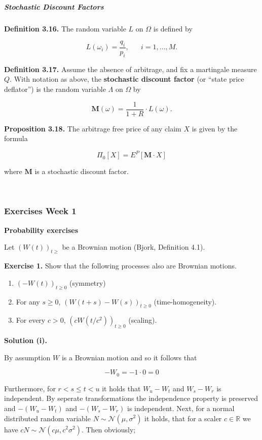 \documentclass[
]{article}
\providecommand{\tightlist}{%
  \setlength{\itemsep}{0pt}\setlength{\parskip}{0pt}}
\begin{document}
\hypertarget{stochastic-discount-factors}{%
\subparagraph{Stochastic Discount
Factors}\label{stochastic-discount-factors}}

\textbf{Definition 3.16.} The random variable \(L\) on \(\Omega\) is
defined by

\[
L(\omega_i)=\frac{q_i}{p_i},\hspace{20pt} i=1,...,M.
\]

\textbf{Definition 3.17.} Assume the absence of arbitrage, and fix a
martingale measure \(Q\). With notation as above, the \textbf{stochastic
discount factor} (or ``state price deflator'') is the random variable
\(\Lambda\) on \(\Omega\) by

\[
\mathbf{M}(\omega)=\frac{1}{1+R}\cdot L(\omega).\tag{3.19}
\]

\textbf{Proposition 3.18.} The arbitrage free price of any claim \(X\)
is given by the formula

\[
\Pi_0[X]=E^P[\mathbf{M}\cdot X]
\]

where \(\mathbf{M}\) is a stochastic discount factor.

~

\hypertarget{exercises-week-1}{%
\subsubsection{Exercises Week 1}\label{exercises-week-1}}

\textbf{Probability exercises}

Let \((W(t))_{t\ge}\) be a Brownian motion (Bjork, Definition 4.1).

\textbf{Exercise 1.} Show that the following processes also are Brownian
motions.

\begin{enumerate}
\def\labelenumi{\roman{enumi}.}
\tightlist
\item
  \((-W(t))_{t\ge 0}\) (symmetry)
\item
  For any \(s\ge 0\), \((W(t+s)-W(s))_{t\ge 0}\) (time-homogeneity).
\item
  For every \(c>0\), \((cW(t/c^2))_{t\ge 0}\) (scaling).
\end{enumerate}

\textbf{Solution (i).}

By assumption \(W\) is a Brownian motion and so it follows that

\[-W_0=-1\cdot0=0\]

Furthermore, for \(r<s\le t< u\) it holds that \(W_u-W_t\) and
\(W_s-W_r\) is independent. By seperate transformations the independence
property is preserved and \(-(W_u-W_t)\) and \(-(W_s-W_r)\) is
independent. Next, for a normal distributed random variable
\(N\sim\mathcal{N}(\mu,\sigma^2)\) it holds, that for a scaler
\(c\in\mathbb{R}\) we have \(c N\sim\mathcal{N}(c\mu,c^2\sigma ^2)\).
Then obviously;
\end{document}
